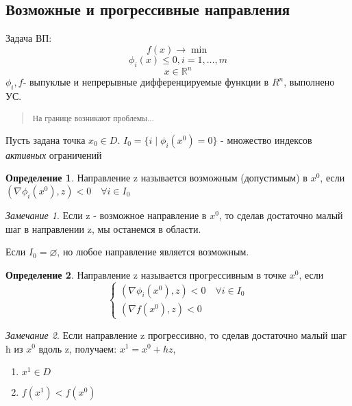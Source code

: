 \documentclass[a4paper]{article}
\theoremstyle{definition}
\newtheorem*{definition}{Определение}
\theoremstyle{remark}
\newtheorem*{remark}{Замечание}
\begin{document}
\subsection{Возможные и прогрессивные направления}
Задача ВП:
\begin{equation}
    f(x) \to \min
\end{equation}
\begin{equation}
    \phi_i(x) \le 0, i = 1, \dots, m
\end{equation}
\begin{equation}
    x \in \mathbb{R}^n
\end{equation}
$\phi_i, f$- выпуклые и непрерывные дифференцируемые функции в $R^n$, выполнено УС.
\begin{quotation}
    \textsubscript{На границе возникают проблемы...}
\end{quotation}
Пусть задана точка $x_0\in D$.
$I_0 = \{i \; | \; \phi_i(x^0) = 0\}$ - множество индексов \textit{активных} ограничений
\begin{definition}
    Направление z называется возможным (допустимым) в $x^0$, если $(\nabla \phi_i(x^0), z)<0 \quad \forall i \in I_0$ 
\end{definition}

\begin{remark}
    Если z - возможное направление в $x^0$, то сделав достаточно малый шаг в направлении z, мы останемся в области.

    Если $I_0 = \varnothing$, но любое направление является возможным.

\end{remark}

\begin{definition}
    Направление z называется прогрессивным в точке $x^0$, если
    \[\begin{cases}
        (\nabla \phi_i(x^0), z)<0 \quad \forall i \in I_0 \\
        (\nabla f(x^0), z)<0 
    \end{cases}\]
\end{definition}
\begin{remark}
    Если направление z прогрессивно, то сделав достаточно малый шаг h из $x^0$ вдоль z, получаем:
    $x^1 = x^0 + hz$, 
    \begin{enumerate}
        \item $x^1 \in D$
        \item $f(x^1) < f(x^0)$
    \end{enumerate}
\end{remark}
\end{document}
